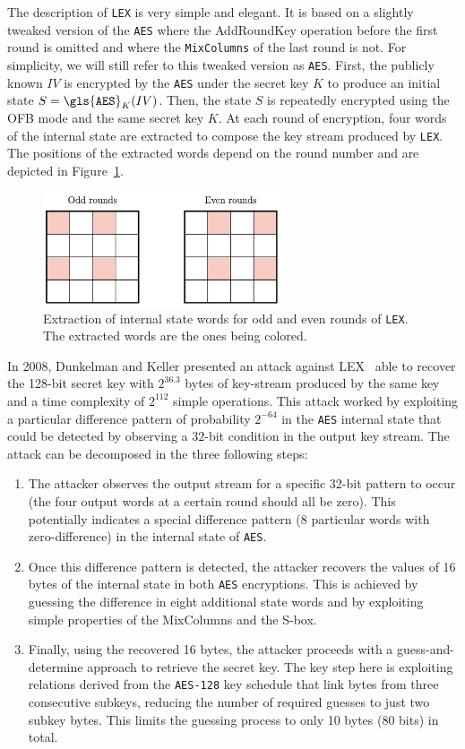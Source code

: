 The description of {\tt LEX} is very simple and elegant. It is based on a slightly tweaked version of the {\tt \gls{AES}} where the {\sf AddRoundKey} operation before the first round is omitted and where the {\tt MixColumns} of the last round is not. For simplicity, we will still refer to this tweaked version as {\tt \gls{AES}}. First, the publicly known $IV$ is encrypted by the {\tt \gls{AES}} under the secret key $K$ to produce an initial state  $S = {\tt \gls{AES}}_K(IV)$. Then, the state $S$ is repeatedly encrypted using the OFB mode and the same secret key $K$. At each round of encryption, four words of the internal state are extracted to compose the key stream produced by {\tt LEX}. The positions of the extracted words depend on the round number and are depicted in Figure~\ref{fig:lex}.

\begin{figure}
  \centering
  \includegraphics[width=7cm]{figures/lex.png}
  \caption{Extraction of internal state words for odd and even rounds of {\tt LEX}\label{fig:lex}. The extracted words are the ones being colored.}
\end{figure}

In 2008, Dunkelman and Keller presented an attack against LEX~\cite{AC:DunKel08b} able to recover the 128-bit secret key with $2^{36.3}$ bytes of key-stream produced by the same key and a time complexity of $2^{112}$ simple operations. This attack worked by exploiting a particular difference pattern of probability $2^{-64}$ in the {\tt \gls{AES}} internal state that could be detected by observing a $32$-bit condition in the output key stream.  The attack can be decomposed  in the three following steps:
\begin{enumerate}
\item  The attacker observes the output stream for a specific 32-bit pattern to occur (the four output words at a certain round should all be zero). This potentially indicates a special difference pattern (8 particular words with zero-difference) in the internal state of {\tt \gls{AES}}. 
\item Once this difference pattern is detected, the attacker recovers the values of 16 bytes of the internal state in both {\tt \gls{AES}} encryptions. This is achieved by guessing the difference in eight additional state words and by exploiting simple properties of the  {\sf MixColumns} and the  \gls{S-box}. 
\item Finally, using the recovered 16 bytes, the attacker proceeds with a guess-and-determine approach to retrieve the secret key. The key step here is exploiting relations derived from the {\tt \gls{AES}-128} key schedule that link bytes from three consecutive subkeys, reducing the number of required guesses to just two subkey bytes. This limits the guessing process to only 10 bytes (80 bits) in total.
\end{enumerate}

